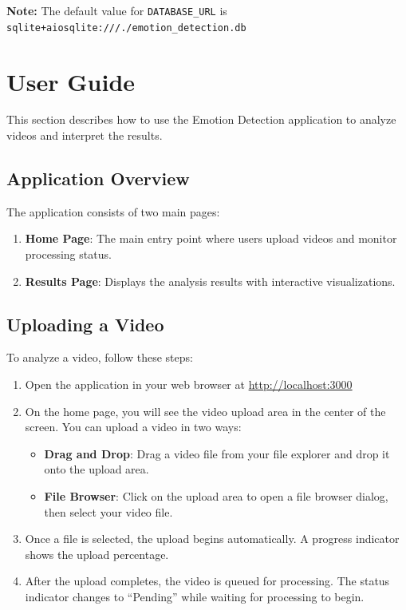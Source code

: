 \noindent\textbf{Note:} The default value for \texttt{DATABASE\_URL} is \texttt{sqlite+aiosqlite:///./emotion\_detection.db}

\section{User Guide}
\label{sec:user-guide}

This section describes how to use the Emotion Detection application to analyze videos and interpret the results.

\subsection{Application Overview}

The application consists of two main pages:

\begin{enumerate}
    \item \textbf{Home Page}: The main entry point where users upload videos and monitor processing status.
    \item \textbf{Results Page}: Displays the analysis results with interactive visualizations.
\end{enumerate}

\subsection{Uploading a Video}

To analyze a video, follow these steps:

\begin{enumerate}
    \item Open the application in your web browser at \url{http://localhost:3000}

    \item On the home page, you will see the video upload area in the center of the screen. You can upload a video in two ways:
    \begin{itemize}
        \item \textbf{Drag and Drop}: Drag a video file from your file explorer and drop it onto the upload area.
        \item \textbf{File Browser}: Click on the upload area to open a file browser dialog, then select your video file.
    \end{itemize}

    \item Once a file is selected, the upload begins automatically. A progress indicator shows the upload percentage.

    \item After the upload completes, the video is queued for processing. The status indicator changes to ``Pending'' while waiting for processing to begin.
\end{enumerate}

